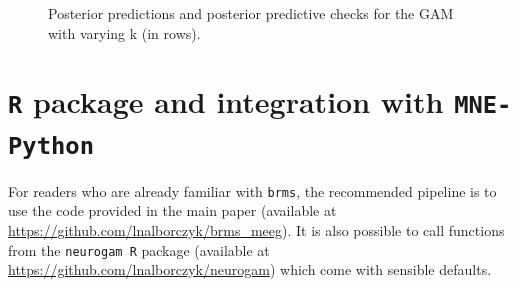 \documentclass[
  doc,
  floatsintext,
  longtable,
  a4paper,
  nolmodern,
  notxfonts,
  notimes,
  colorlinks=true,linkcolor=blue,citecolor=blue,urlcolor=blue]{apa7}
\begin{document}
\begin{figure}[!htb]

\caption{\label{fig-choose-k}Posterior predictions and posterior
predictive checks for the GAM with varying k (in rows).}


\end{figure}%

\newpage

\section{\texorpdfstring{\texttt{R} package and integration with
\texttt{MNE-Python}}{R package and integration with MNE-Python}}\label{apx-package}

\setlength{\parindent}{0pt}
\setlength{\parskip}{6pt}

For readers who are already familiar with \texttt{brms}, the recommended
pipeline is to use the code provided in the main paper (available at
\url{https://github.com/lnalborczyk/brms_meeg}). It is also possible to
call functions from the \texttt{neurogam\ R} package (available at
\url{https://github.com/lnalborczyk/neurogam}) which come with sensible
defaults.
\end{document}
